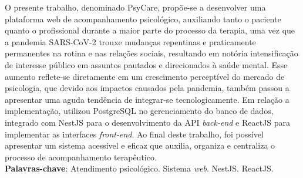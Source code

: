 \begin{resumo}[RESUMO]
\begin{SingleSpacing}

O presente trabalho, denominado PsyCare, propõe-se a desenvolver uma plataforma web de acompanhamento psicológico, auxiliando tanto o paciente quanto o profissional durante a maior parte do processo da terapia, uma vez que a pandemia SARS-CoV-2 trouxe mudanças repentinas e praticamente permanentes na rotina e nas relações sociais, resultando em notória intensificação de interesse público em assuntos pautados e direcionados à saúde mental. Esse aumento reflete-se diretamente em um crescimento perceptível do mercado de psicologia, que devido aos impactos causados pela pandemia, também passou a apresentar uma aguda tendência de integrar-se tecnologicamente. Em relação a implementação, utilizou PostgreSQL no gerenciamento do banco de dados, integrado com NestJS para o desenvolvimento da API \textit{back-end} e ReactJS para implementar as interfaces \textit{front-end}. Ao final deste trabalho, foi possível apresentar um sistema acessível e eficaz que auxilia, organiza e centraliza o processo de acompanhamento terapêutico. \\

\textbf{Palavras-chave}: Atendimento psicológico. Sistema \textit{web}. NestJS. ReactJS.

\end{SingleSpacing}
\end{resumo}

